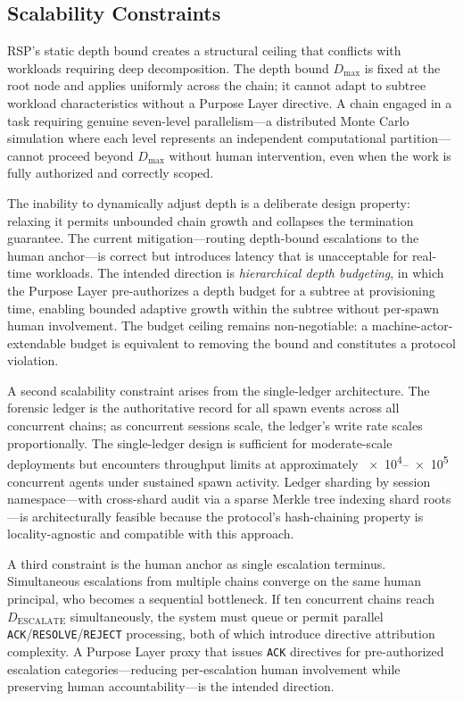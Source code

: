 \subsection{Scalability Constraints}
\label{sec:rs-scalability}

RSP's static depth bound creates a structural ceiling that conflicts with workloads requiring deep decomposition. The depth bound $D_{\max}$ is fixed at the root node and applies uniformly across the chain; it cannot adapt to subtree workload characteristics without a Purpose Layer directive. A chain engaged in a task requiring genuine seven-level parallelism---a distributed Monte Carlo simulation where each level represents an independent computational partition---cannot proceed beyond $D_{\max}$ without human intervention, even when the work is fully authorized and correctly scoped.

The inability to dynamically adjust depth is a deliberate design property: relaxing it permits unbounded chain growth and collapses the termination guarantee. The current mitigation---routing depth-bound escalations to the human anchor---is correct but introduces latency that is unacceptable for real-time workloads. The intended direction is \emph{hierarchical depth budgeting}, in which the Purpose Layer pre-authorizes a depth budget for a subtree at provisioning time, enabling bounded adaptive growth within the subtree without per-spawn human involvement. The budget ceiling remains non-negotiable: a machine-actor-extendable budget is equivalent to removing the bound and constitutes a protocol violation.

A second scalability constraint arises from the single-ledger architecture. The forensic ledger is the authoritative record for all spawn events across all concurrent chains; as concurrent sessions scale, the ledger's write rate scales proportionally. The single-ledger design is sufficient for moderate-scale deployments but encounters throughput limits at approximately \numrange{e4}{e5} concurrent agents under sustained spawn activity. Ledger sharding by session namespace---with cross-shard audit via a sparse Merkle tree indexing shard roots---is architecturally feasible because the protocol's hash-chaining property is locality-agnostic and compatible with this approach.

A third constraint is the human anchor as single escalation terminus. Simultaneous escalations from multiple chains converge on the same human principal, who becomes a sequential bottleneck. If ten concurrent chains reach $D_{\text{ESCALATE}}$ simultaneously, the system must queue or permit parallel \texttt{ACK}/\texttt{RESOLVE}/\texttt{REJECT} processing, both of which introduce directive attribution complexity. A Purpose Layer proxy that issues \texttt{ACK} directives for pre-authorized escalation categories---reducing per-escalation human involvement while preserving human accountability---is the intended direction.

